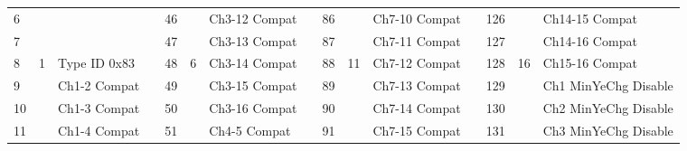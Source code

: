 \documentclass[]{article}
\begin{document}
\begin{landscape}
\begin{table}[]
\begin{tabular}{lllllllllllllll}
			6            &                     &                                &                    & 46           &                      & Ch3-12  Compat    &  & 86           &                      & Ch7-10  Compat    &  & 126                                                                                             &                                              & Ch14-15  Compat                                    \\
			7            &                     &                                &                    & 47           &                      & Ch3-13  Compat    &  & 87           &                      & Ch7-11  Compat    &  & 127                                                                                             &                                              & Ch14-16  Compat                                    \\
			8            & \multirow{-8}{*}{1} & \multirow{-8}{*}{Type ID 0x83} & \multirow{-9}{*}{} & 48           & \multirow{-8}{*}{6}  & Ch3-14  Compat    &  & 88           & \multirow{-8}{*}{11} & Ch7-12  Compat    &  & 128                                                                                             & \multirow{-8}{*}{16}                         & Ch15-16  Compat                                    \\ \cline{1-3} \cline{5-7} \cline{9-11} \cline{13-15} 
			9            &                     & Ch1-2  Compat                  &                    & 49           &                      & Ch3-15  Compat    &  & 89           &                      & Ch7-13  Compat    &  & 129                                                                                             &                                              & Ch1 MinYeChg Disable                               \\
			10           &                     & Ch1-3  Compat                  &                    & 50           &                      & Ch3-16  Compat    &  & 90           &                      & Ch7-14  Compat    &  & 130                                                                                             &                                              & Ch2 MinYeChg Disable                               \\
			11           &                     & Ch1-4  Compat                  &                    & 51           &                      & Ch4-5  Compat     &  & 91           &                      & Ch7-15  Compat    &  & 131                                                                                             &                                              & Ch3 MinYeChg Disable                               \\

\end{tabular}
\end{table}
\end{landscape}
\end{document}
